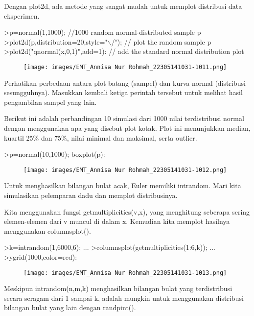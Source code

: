 \documentclass[a4paper,10pt]{article}
\begin{document}
\begin{eulernotebook}
\begin{eulercomment}
\begin{eulercomment}
\begin{eulercomment}
\begin{eulercomment}
\begin{eulercomment}
Dengan plot2d, ada metode yang sangat mudah untuk memplot distribusi
data eksperimen.
\end{eulercomment}
\begin{eulerprompt}
>p=normal(1,1000); //1000 random normal-distributed sample p
>plot2d(p,distribution=20,style="\(\backslash\)/"); // plot the random sample p
>plot2d("qnormal(x,0,1)",add=1): // add the standard normal distribution plot
\end{eulerprompt}
\begin{figure}[h]
    \centering
    \texttt{[image: images/EMT\_Annisa Nur Rohmah\_22305141031-1011.png]}
\end{figure}
\begin{eulercomment}
Perhatikan perbedaan antara plot batang (sampel) dan kurva normal
(distribusi sesungguhnya). Masukkan kembali ketiga perintah tersebut
untuk melihat hasil pengambilan sampel yang lain.
\end{eulercomment}
\begin{eulercomment}
Berikut ini adalah perbandingan 10 simulasi dari 1000 nilai
terdistribusi normal dengan menggunakan apa yang disebut plot kotak.
Plot ini menunjukkan median, kuartil 25\% dan 75\%, nilai minimal dan
maksimal, serta outlier.
\end{eulercomment}
\begin{eulerprompt}
>p=normal(10,1000); boxplot(p):
\end{eulerprompt}
\begin{figure}[h]
    \centering
    \texttt{[image: images/EMT\_Annisa Nur Rohmah\_22305141031-1012.png]}
\end{figure}
\begin{eulercomment}
Untuk menghasilkan bilangan bulat acak, Euler memiliki intrandom. Mari
kita simulasikan pelemparan dadu dan memplot distribusinya.

Kita menggunakan fungsi getmultiplicities(v,x), yang menghitung
seberapa sering elemen-elemen dari v muncul di dalam x. Kemudian kita
memplot hasilnya menggunakan columnsplot().
\end{eulercomment}
\begin{eulerprompt}
>k=intrandom(1,6000,6);  ...
>columnsplot(getmultiplicities(1:6,k));  ...
>ygrid(1000,color=red):
\end{eulerprompt}
\begin{figure}[h]
    \centering
    \texttt{[image: images/EMT\_Annisa Nur Rohmah\_22305141031-1013.png]}
\end{figure}
\begin{eulercomment}
Meskipun intrandom(n,m,k) menghasilkan bilangan bulat yang
terdistribusi secara seragam dari 1 sampai k, adalah mungkin untuk
menggunakan distribusi bilangan bulat yang lain dengan randpint().


\end{eulercomment}
\end{eulercomment}
\end{eulercomment}
\end{eulercomment}
\end{eulercomment}
\end{eulernotebook}
\end{document}
